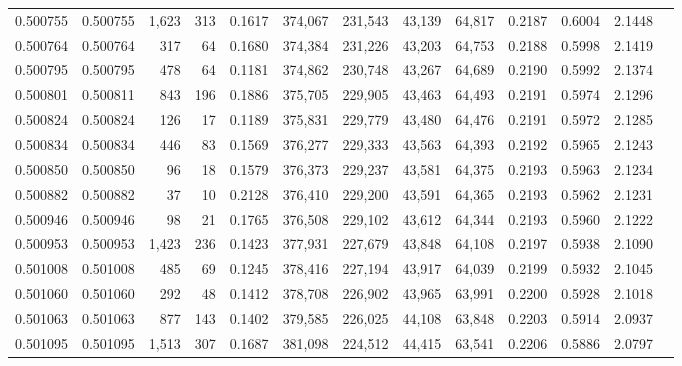 \begin{tabular}{rrrrrrrrrrrrr}
0.500755 & 0.500755 & 1,623 &   313 &                                     0.1617 & 374,067 & 231,543 &  43,139 &  64,817 & 0.2187 & 0.6004 & 2.1448 \\
0.500764 & 0.500764 &   317 &    64 &                                     0.1680 & 374,384 & 231,226 &  43,203 &  64,753 & 0.2188 & 0.5998 & 2.1419 \\
0.500795 & 0.500795 &   478 &    64 &                                     0.1181 & 374,862 & 230,748 &  43,267 &  64,689 & 0.2190 & 0.5992 & 2.1374 \\
0.500801 & 0.500811 &   843 &   196 &                                     0.1886 & 375,705 & 229,905 &  43,463 &  64,493 & 0.2191 & 0.5974 & 2.1296 \\
0.500824 & 0.500824 &   126 &    17 &                                     0.1189 & 375,831 & 229,779 &  43,480 &  64,476 & 0.2191 & 0.5972 & 2.1285 \\
0.500834 & 0.500834 &   446 &    83 &                                     0.1569 & 376,277 & 229,333 &  43,563 &  64,393 & 0.2192 & 0.5965 & 2.1243 \\
0.500850 & 0.500850 &    96 &    18 &                                     0.1579 & 376,373 & 229,237 &  43,581 &  64,375 & 0.2193 & 0.5963 & 2.1234 \\
0.500882 & 0.500882 &    37 &    10 &                                     0.2128 & 376,410 & 229,200 &  43,591 &  64,365 & 0.2193 & 0.5962 & 2.1231 \\
0.500946 & 0.500946 &    98 &    21 &                                     0.1765 & 376,508 & 229,102 &  43,612 &  64,344 & 0.2193 & 0.5960 & 2.1222 \\
0.500953 & 0.500953 & 1,423 &   236 &                                     0.1423 & 377,931 & 227,679 &  43,848 &  64,108 & 0.2197 & 0.5938 & 2.1090 \\
0.501008 & 0.501008 &   485 &    69 &                                     0.1245 & 378,416 & 227,194 &  43,917 &  64,039 & 0.2199 & 0.5932 & 2.1045 \\
0.501060 & 0.501060 &   292 &    48 &                                     0.1412 & 378,708 & 226,902 &  43,965 &  63,991 & 0.2200 & 0.5928 & 2.1018 \\
0.501063 & 0.501063 &   877 &   143 &                                     0.1402 & 379,585 & 226,025 &  44,108 &  63,848 & 0.2203 & 0.5914 & 2.0937 \\
0.501095 & 0.501095 & 1,513 &   307 &                                     0.1687 & 381,098 & 224,512 &  44,415 &  63,541 & 0.2206 & 0.5886 & 2.0797 \\

\end{tabular}
